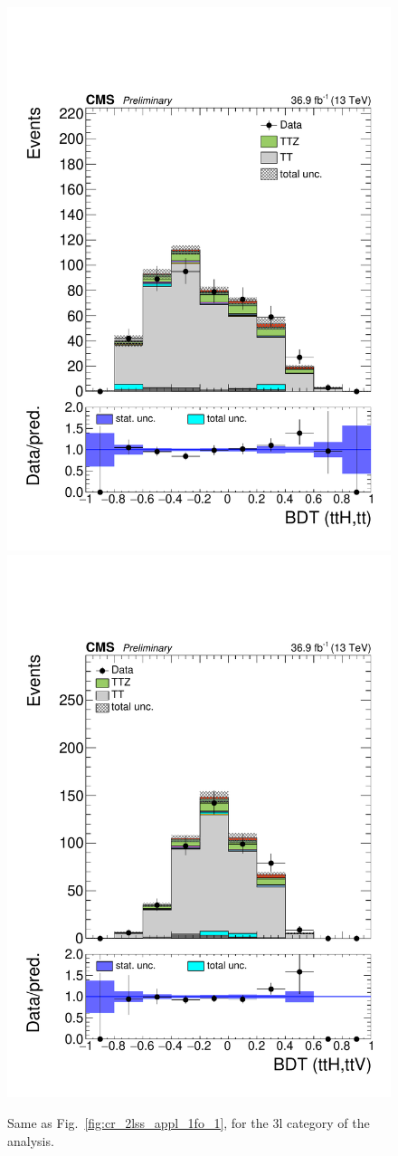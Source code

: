 \begin{figure}[!htb]
\centering
\includegraphics[width=0.30\linewidth]{plots_controlregions/3l_appl_1fo_data/kinMVA_3l_ttbar.pdf}
\includegraphics[width=0.30\linewidth]{plots_controlregions/3l_appl_1fo_data/kinMVA_3l_ttV.pdf}
\caption{Same as Fig.~\ref{fig:cr_2lss_appl_1fo_1}, for the 3l category of the analysis.}
\label{fig:cr_3l_appl_1fo_1}
\end{figure}


